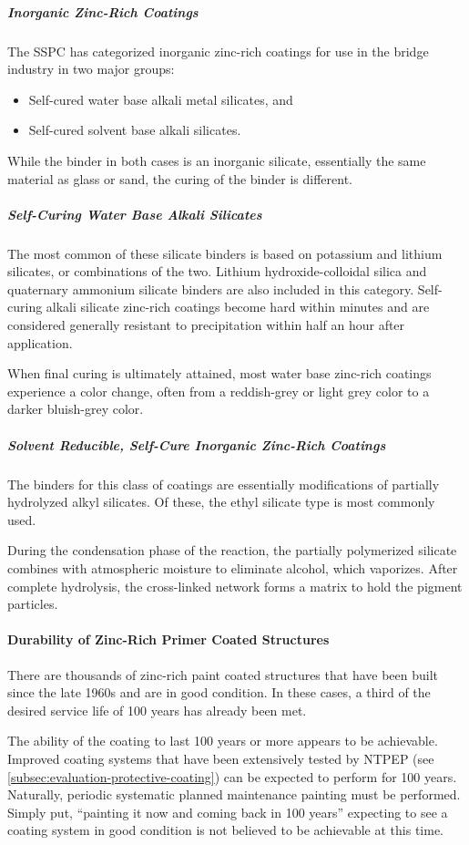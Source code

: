 \subparagraph{Inorganic Zinc-Rich Coatings}
The SSPC has categorized inorganic zinc-rich coatings for use in the bridge industry in two major groups:
\begin{itemize}
  \item Self-cured water base alkali metal silicates, and
  \item Self-cured solvent base alkali silicates.
\end{itemize}

While the binder in both cases is an inorganic silicate, essentially the same material as glass or sand, the curing of
the binder is different.


\subparagraph{Self-Curing Water Base Alkali Silicates}
The most common of these silicate binders is based on potassium and lithium silicates, or combinations of the
two. Lithium hydroxide-colloidal silica and quaternary ammonium silicate binders are also included in this category.
Self-curing alkali silicate zinc-rich coatings become hard within minutes and are considered generally resistant to
precipitation within half an hour after application.

When final curing is ultimately attained, most water base zinc-rich coatings experience a color change, often
from a reddish-grey or light grey color to a darker bluish-grey color.


\subparagraph{Solvent Reducible, Self-Cure Inorganic Zinc-Rich Coatings}
The binders for this class of coatings are essentially modifications of partially hydrolyzed alkyl silicates. Of
these, the ethyl silicate type is most commonly used.

During the condensation phase of the reaction, the partially polymerized silicate combines with atmospheric
moisture to eliminate alcohol, which vaporizes. After complete hydrolysis, the cross-linked network forms a matrix
to hold the pigment particles.

\paragraph{Durability of Zinc-Rich Primer Coated Structures}
There are thousands of zinc-rich paint coated structures that have been built since the late 1960s and are in good condition. In these cases, a third of the desired service life of 100 years has already been met.

The ability of the coating to last 100 years or more appears to be achievable. Improved coating systems that have been extensively tested by NTPEP (see \cref{subsec:evaluation-protective-coating}) can be expected to perform for 100 years. Naturally, periodic systematic planned maintenance painting must be performed. Simply put, “painting it now and coming back in 100 years” expecting to see a coating system in good condition is not believed to be achievable at this time.

